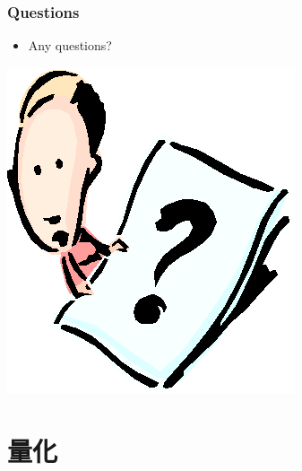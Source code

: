 \documentclass[CJKutf8,dvipsnames,table]{beamer}
\newif\ifxetexorluatex %
\begin{document}
\begin{CJK*}{UTF8}{song}
  \begin{frame}
    \frametitle{Questions}
    \begin{itemize}
    \item Any questions?
    \end{itemize}
    \begin{center}
      \includegraphics[scale=.5]{question}
    \end{center}
  \end{frame} 
  
	\section{量化}

\ifxetexorluatex\else
\end{CJK*}
\fi
\end{document}
